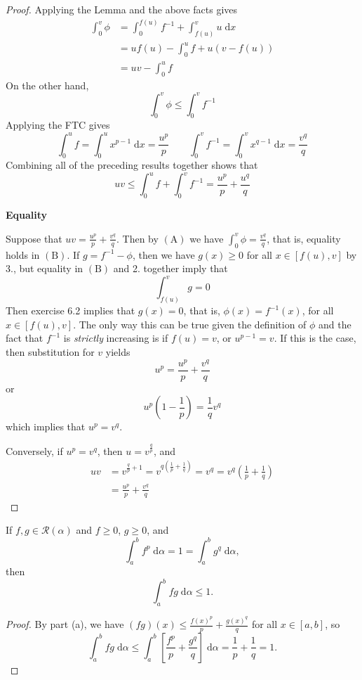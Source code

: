 \documentclass{homework}
\begin{document}
\begin{alphaparts}
\begin{proof}
			Applying the Lemma and the above facts gives
			\begin{align}
				\tag{A}
				\int_0^v\phi &= \int_0^{f(u)}f^{-1} + \int_{f(u)}^vu\;\text{d}x\\
				&= uf(u) - \int_0^uf + u(v-f(u))\\
				&= uv - \int_0^u f
			\end{align}
			On the other hand,
			\begin{equation}
				\tag{B}
			\int_0^v \phi \le \int_0^vf^{-1}
			\end{equation}
			Applying the FTC gives
			$$
			\int_0^u f = \int_0^u x^{p-1}\;\text{d}x = \frac{u^p}{p}\qquad\int_0^vf^{-1} = \int_0^vx^{q-1}\;\text{d}x = \frac{v^q}{q}
			$$
			Combining all of the preceding results together shows that
			$$
			uv \le \int_0^u f + \int_0^v f^{-1} = \frac{u^p}{p} + \frac{u^q}{q}
			$$
			
			\textbf{Equality}
			
			Suppose that $uv = \frac{u^p}{p} + \frac{v^q}{q}$. Then by $(\text{A})$ we have $\int_0^v \phi = \frac{v^q}{q}$, that is, equality holds in $(\text{B})$. If $g = f^{-1} - \phi$, then we have $g(x) \ge 0$ for all $x \in [f(u), v]$ by 3., but equality in $(\text{B})$ and 2. together imply that
			$$
			\int_{f(u)}^vg = 0
			$$
			Then exercise 6.2 implies that $g(x) =0$, that is, $\phi(x) = f^{-1}(x)$, for all $x \in [f(u), v]$. The only way this can be true given the definition of $\phi$ and the fact that $f^{-1}$ is \textit{strictly} increasing is if $f(u) = v$, or $u^{p-1} = v$. If this is the case, then substitution for $v$ yields
			$$
			u^p = \frac{u^p}{p} + \frac{v^q}{q}
			$$
			or
			$$
			u^p\left(1-\frac{1}{p}\right) = \frac{1}{q}v^q
			$$
			which implies that $u^p = v^q$.
			
			Conversely, if $u^p = v^q$, then $u = v^\frac{q}{p}$, and 
			$$
			\begin{aligned}
				uv &= v^{\frac{q}{p}+1}=v^{q\left(\frac{1}{p}+\frac{1}{q}\right)} = v^q = v^q\left(\frac{1}{p} + \frac{1}{q}\right)\\
				&= \frac{u^p}{p} + \frac{v^q}{q}
			\end{aligned}
			$$
		\end{proof}
		
		\questionpart %
		
		If $f,g \in \mathscr{R}(\alpha)$ and $f \ge 0$, $g \ge 0$, and
		$$
		\int_a^b f^p \;\text{d}\alpha = 1 = \int_a^b g^q\;\text{d}\alpha,
		$$
		then
		$$
		\int_a^b fg\;\text{d}\alpha \le 1.
		$$
		\begin{proof}
			By part (a), we have $(fg)(x) \le \frac{f(x)^p}{p} + \frac{g(x)^q}{q}$ for all $x \in [a,b]$, so
			$$
			\int_a^b fg \;\text{d}\alpha \le \int_a^b\left[\frac{f^p}{p} + \frac{g^q}{q}\right]\;\text{d}\alpha = \frac{1}{p} + \frac{1}{q} = 1.
			$$
		\end{proof}
		

\end{alphaparts}
\end{document}
